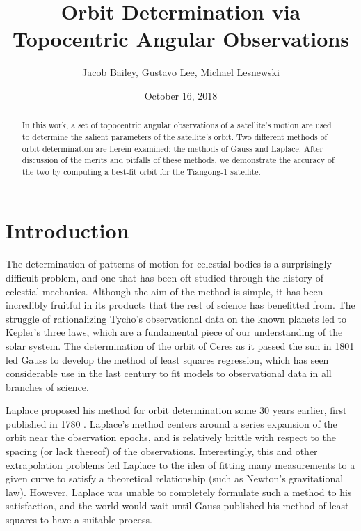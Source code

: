 \documentclass[11pt,twoside,letterpaper]{article}
\begin{document}
\title{Orbit Determination via Topocentric Angular Observations}
\author{Jacob Bailey, Gustavo Lee, Michael Lesnewski}
\date{October 16, 2018}
\maketitle

  \begin{abstract}
    In this work, a set of topocentric angular observations of a
    satellite's motion are used to determine the salient parameters of
    the satellite's orbit. Two different methods of orbit
    determination are herein examined: the methods of Gauss and
    Laplace. After discussion of the merits and pitfalls of these
    methods, we demonstrate the accuracy of the two by computing a
    best-fit orbit for the Tiangong-1 satellite.
  \end{abstract}

  \section {Introduction}
  \paragraph{}
  The determination of patterns of motion for celestial bodies is a
  surprisingly difficult problem, and one that has been oft studied
  through the history of celestial mechanics. Although the aim of the
  method is simple, it has been incredibly fruitful in its products
  that the rest of science has benefitted from. The struggle of
  rationalizing Tycho's observational data on the known planets led to
  Kepler's three laws, which are a fundamental piece of our
  understanding of the solar system. The determination of the orbit of
  Ceres as it passed the sun in 1801 led Gauss to develop the method
  of least squares regression, which has seen considerable use in the
  last century to fit models to observational data in all branches of
  science.

  Laplace proposed his method for orbit determination some 30 years
  earlier, first published in 1780
  \cite{bate_mueller_white_2015}. Laplace's method centers around a
  series expansion of the orbit near the observation epochs, and is
  relatively brittle with respect to the spacing (or lack thereof) of
  the observations. Interestingly, this and other extrapolation
  problems led Laplace to the idea of fitting many measurements to a
  given curve to satisfy a theoretical relationship (such as Newton's
  gravitational law). However, Laplace was unable to completely
  formulate such a method to his satisfaction, and the world would
  wait until Gauss published his method of least squares to have a
  suitable process. 
\end{document}
